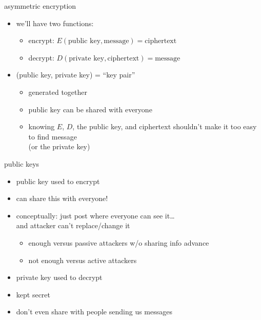 \begin{frame}{asymmetric encryption}
\begin{itemize}
\item we'll have two functions:
    \begin{itemize}
    \item encrypt: $E(\text{public key}, \text{message}) = \text{ciphertext}$
    \item decrypt: $D(\text{private key}, \text{ciphertext}) = \text{message}$
    \end{itemize}
\item (public key, private key) = ``key pair''
    \begin{itemize}
    \item generated together
    \item public key can be shared with everyone
    \item knowing $E$, $D$, the public key, and ciphertext shouldn't make it too easy to find message \\
        (or the private key)
    \end{itemize}
\end{itemize}
\end{frame}

\begin{frame}{public keys}
    \begin{itemize}
    \item public key used to encrypt
    \item can share this with everyone!
    \item conceptually: just post where everyone can see it\ldots \\
        and attacker can't replace/change it
        \begin{itemize}
        \item enough versus passive attackers w/o sharing info advance
        \item not enough versus active attackers
        \end{itemize}
    \vspace{.5cm}
    \item private key used to decrypt
    \item kept secret
    \item don't even share with people sending us messages
    \end{itemize}
\end{frame}

